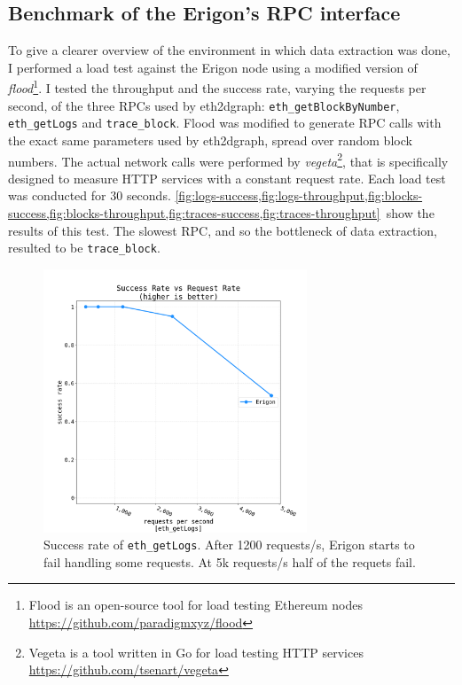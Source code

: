 \subsection{Benchmark of the Erigon's RPC interface}

To give a clearer overview of the environment in which data extraction was done, I performed a load test against the Erigon node using a modified version of \textit{flood}\footnote{Flood is an open-source tool for load testing Ethereum nodes \url{https://github.com/paradigmxyz/flood}}. I tested the throughput and the success rate, varying the requests per second, of the three RPCs used by eth2dgraph: {\tt eth\_getBlockByNumber}, {\tt eth\_getLogs} and {\tt trace\_block}. Flood was modified to generate RPC calls with the exact same parameters used by eth2dgraph, spread over random block numbers. The actual network calls were performed by \textit{vegeta}\footnote{Vegeta is a tool written in Go for load testing HTTP services \url{https://github.com/tsenart/vegeta}}, that is specifically designed to measure HTTP services with a constant request rate. Each load test was conducted for 30 seconds. \cref{fig:logs-success,fig:logs-throughput,fig:blocks-success,fig:blocks-throughput,fig:traces-success,fig:traces-throughput}~show the results of this test. The slowest RPC, and so the bottleneck of data extraction, resulted to be {\tt trace\_block}. 

\begin{figure}[H]
    \centering
    \includegraphics[width=0.7\textwidth]{Figures/results/load_tests/logs/success_rate_logs.png}
    \caption{Success rate of {\tt eth\_getLogs}. After 1200 requests/s, Erigon starts to fail handling some requests. At 5k requests/s half of the requets fail. }
    \label{fig:logs-success}
\end{figure}

